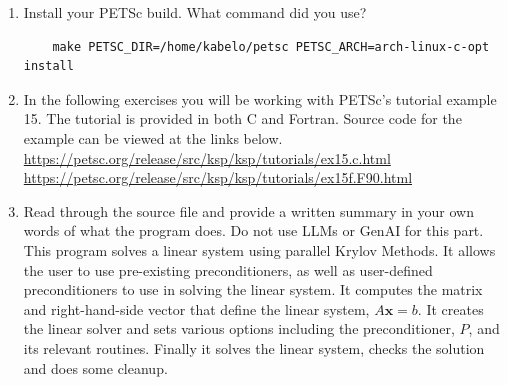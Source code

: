 \documentclass[letterpaper]{article}
\begin{document}
\begin{enumerate}
\begin{lstlisting}
    make PETSC_DIR=/gpfs/accounts/ners570f26_class_root/ners570f26_class/kabelo/petsc PETSC_ARCH="" check
\end{lstlisting}
    \item Install your PETSc build. What command did you use? \\
\begin{lstlisting}
    make PETSC_DIR=/home/kabelo/petsc PETSC_ARCH=arch-linux-c-opt install
\end{lstlisting}
    \item In the following exercises you will be working with PETSc’s tutorial example 15. The tutorial is provided in both C and Fortran.
        Source code for the example can be viewed at the links below.\\
        \url{https://petsc.org/release/src/ksp/ksp/tutorials/ex15.c.html}\\
        \url{https://petsc.org/release/src/ksp/ksp/tutorials/ex15f.F90.html}

    \item Read through the source file and provide a written summary in your own words of what the program does. Do not use LLMs or GenAI for this part. \\

    This program solves a linear system using parallel Krylov Methods. It allows the user to use pre-existing preconditioners, as well as user-defined preconditioners to use in solving the linear system. It computes the matrix and right-hand-side vector that define the linear system, $A\mathbf{x} = b$. It creates the linear solver and sets various options including the preconditioner, $P$, and its relevant routines. Finally it solves the linear system, checks the solution and does some cleanup.
    

\end{enumerate}
\end{document}
